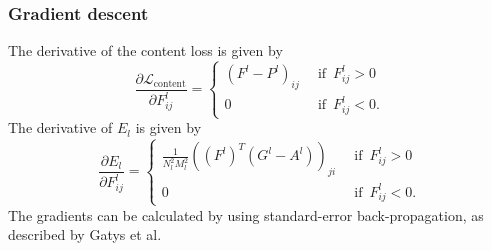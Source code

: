 \subsubsection{Gradient descent}
The derivative of the content loss is given by
\begin{equation}
    \frac{\partial\mathcal{L}_\text{content}}{\partial F_{ij}^l}=\begin{cases}
    (F^l-P^l)_{ij}\,&\text{ if }\,F_{ij}^l>0\\
    0\,&\text{ if }\,F_{ij}^l<0.
    \end{cases}
\end{equation}
The derivative of $E_l$ is given by
\begin{equation}
    \frac{\partial E_l}{\partial F_{ij}^l}=\begin{cases}
    \frac{1}{N_l^2M_l^2}\left((F^l)^T(G^l-A^l)\right)_{ji}\,&\text{ if }\,F_{ij}^l>0\\
    0\,&\text{ if }\,F_{ij}^l<0.
    \end{cases}
\end{equation}
The gradients can be calculated by using standard-error back-propagation, as described by Gatys et al.